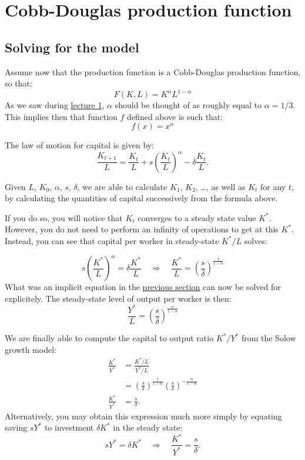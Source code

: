 \documentclass[]{book}
\theoremstyle{definition}
\theoremstyle{definition}
\theoremstyle{definition}
\theoremstyle{remark}
\begin{document}
\hypertarget{cobb}{\section{Cobb-Douglas production
function}\label{cobb}}

\subsection{Solving for the model}\label{solving-for-the-model}

Assume now that the production function is a Cobb-Douglas production
function, so that:\\
\[F(K,L)=K^{\alpha}L^{1-\alpha}\] As we saw during
\protect\hyperlink{intro-cobb}{lecture 1}, \(\alpha\) should be thought
of as roughly equal to \(\alpha = 1/3\). This implies then that function
\(f\) defined above is such that: \[f(x)=x^{\alpha}\]

The law of motion for capital is given by:\\
\[\frac{K_{t+1}}{L}=\frac{K_{t}}{L}+s\left(\frac{K_{t}}{L}\right)^{\alpha}-\delta\frac{K_{t}}{L}.\]

Given \(L\), \(K_{0}\), \(\alpha\), \(s\), \(\delta\), we are able to
calculate \(K_{1}\), \(K_{2}\), \ldots{}, as well as \(K_{t}\) for any
\(t\), by calculating the quantities of capital successively from the
formula above.

If you do so, you will notice that \(K_{t}\) converges to a steady state
value \(K^{*}\). However, you do not need to perform an infinity of
operations to get at this \(K^{*}\). Instead, you can see that capital
per worker in steady-state \(K^{*}/L\) solves:

\[s\left(\frac{K^{*}}{L}\right)^{\alpha}=\delta\frac{K^{*}}{L}\quad\Rightarrow\quad \boxed{\frac{K^{*}}{L}=\left(\frac{s}{\delta}\right)^{\frac{1}{1-\alpha}}}\]
What was an implicit equation in the
\protect\hyperlink{general-production-f}{previous section} can now be
solved for explicitely. The steady-state level of output per worker is
then:
\[\frac{Y^{*}}{L}=\left(\frac{s}{\delta}\right)^{\frac{\alpha}{1-\alpha}}\]

We are finally able to compute the capital to output ratio
\(K^{*}/Y^{*}\) from the Solow growth model: \[
\begin{aligned}
\frac{K^{*}}{Y^{*}}&=\frac{K^{*}/L}{Y^{*}/L}\\
&=\left(\frac{s}{\delta}\right)^{\frac{1}{1-\alpha}}  \left(\frac{s}{\delta}\right)^{-\frac{\alpha}{1-\alpha}} \\
\frac{K^{*}}{Y^{*}}&= \frac{s}{\delta}.
\end{aligned}
\] Alternatively, you may obtain this expression much more simply by
equating saving \(sY^{*}\) to investment \(\delta K^{*}\) in the steady
state:
\[sY^{*} = \delta K^{*} \quad \Rightarrow \quad \boxed{\frac{K^{*}}{Y^{*}} = \frac{s}{\delta}}.\]
\end{document}
